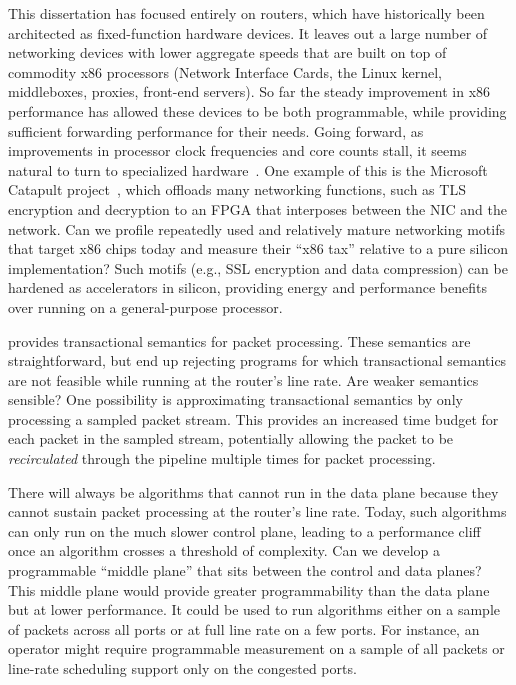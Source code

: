  This dissertation has focused entirely on
routers, which have historically been architected as fixed-function hardware
devices. It leaves out a large number of networking devices with lower
aggregate speeds that are built on top of commodity x86 processors (\eg Network
Interface Cards, the Linux kernel, middleboxes, proxies, front-end servers). So
far the steady improvement in x86 performance has allowed these devices to be
both programmable, while providing sufficient forwarding performance for their
needs. Going forward, as improvements in processor clock frequencies and core
counts stall, it seems natural to turn to specialized hardware~\cite{dark_silicon, four_horsemen}.  One example of this is the Microsoft Catapult
project~\cite{catapult}, which offloads many networking functions, such as TLS
encryption and decryption to an FPGA that interposes between the NIC and the
network. Can we profile repeatedly used and relatively mature networking motifs
that target x86 chips today and measure their “x86 tax” relative to a pure
silicon implementation? Such motifs (e.g., SSL encryption and data compression)
can be hardened as accelerators in silicon, providing energy and performance
benefits over running on a general-purpose processor.

 \pktlanguage provides
transactional semantics for packet processing. These semantics are
straightforward, but end up rejecting programs for which transactional
semantics are not feasible while running at the router's line rate.  Are weaker
semantics sensible? One possibility is approximating transactional semantics by
only processing a sampled packet stream.  This provides an increased time
budget for each packet in the sampled stream, potentially allowing the packet
to be {\em recirculated} through the pipeline multiple times for packet
processing.

 There will always be algorithms that
cannot run in the data plane because they cannot sustain packet processing at
the router’s line rate. Today, such algorithms can only run on the much slower
control plane, leading to a performance cliff once an algorithm crosses a
threshold of complexity. Can we develop a programmable “middle plane” that sits
between the control and data planes? This middle plane would provide greater
programmability than the data plane but at lower performance. It could be used
to run algorithms either on a sample of packets across all ports or at full
line rate on a few ports. For instance, an operator might require programmable
measurement on a sample of all packets or line-rate scheduling support only on
the congested ports.

